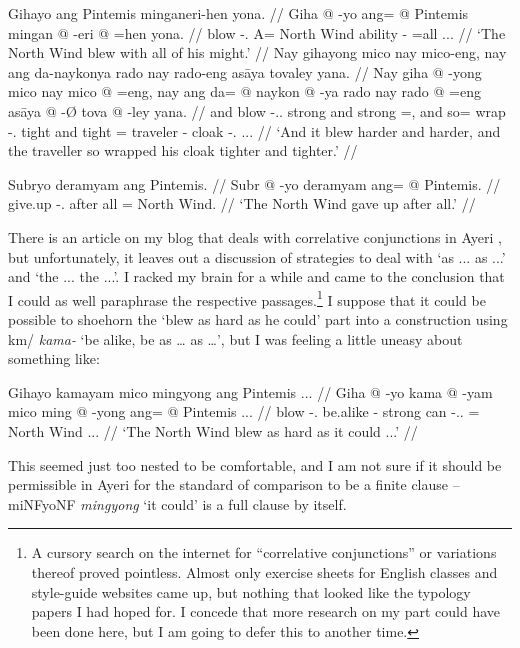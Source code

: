 \documentclass[12pt,paper=a4]{scrartcl}
\newcommand{\ques}{\fakesuperscript{?}} %
\newcommand{\xayr}[3]{{\Tagati #1} \emph{#2} \enquote*{#3}}
\begin{document}
\pex %
\a \begingl
	\glpreamble Gihayo ang Pintemis minganeri-hen yona. //
	\gla Giha @ -yo ang= @ Pintemis mingan @ -eri @ =hen yona. //
	\glb blow -\Tsg{}.\N{} A= {North Wind} ability -\Ins{} =all \Tsg{}.\N{}.\Gen{}. //
	\glft `The North Wind blew with all of his might.' //
\endgl
\a \begingl
	\glpreamble Nay gihayong mico nay mico-eng, nay ang da-naykonya rado nay rado-eng asāya tovaley yana. //
	\gla Nay giha @ -yong mico nay mico @ =eng, nay ang da= @ naykon @ -ya rado nay rado @ =eng asāya @ -Ø tova @ -ley yana. //
	\glb and blow -\Tsg.\N{}.\Aarg{} strong and strong =\Comp{}, and \AgtT{} so= wrap -\Tsg{}.\M{} tight and tight =\Comp{} traveler -\Top{} cloak -\Parg{}.\Inan{} \Tsg{}.\M{}.\Gen{}. //
	\glft `And it blew harder and harder, and the traveller so wrapped his cloak tighter and tighter.' //
\endgl

\a \begingl
	\glpreamble Subryo deramyam ang Pintemis. //
	\gla Subr @ -yo deramyam ang= @ Pintemis. //
	\glb give.up -\Tsg{}.\N{} {after all} \Aarg{}= {North Wind}. //
	\glft `The North Wind gave up after all.' //
\endgl
\xe

There is an article on my blog that deals with correlative conjunctions in Ayeri \autocite{becker2012}, but unfortunately, it leaves out a discussion of strategies to deal with `as ... as ...' and `the ... the ...'. I racked my brain for a while and came to the conclusion that I could as well paraphrase the respective passages.\footnote{A cursory search on the internet for \enquote{correlative conjunctions} or variations thereof proved pointless. Almost only exercise sheets for English classes and style-guide websites came up, but nothing that looked like the typology papers I had hoped for. I concede that more research on my part could have been done here, but I am going to defer this to another time.} I suppose that it could be possible to shoehorn the `blew as hard as he could' part into a construction using \xayr{km/}{kama-}{be alike, be as … as …}, but I was feeling a little uneasy about something like:

\ex[exno=iii]
\begingl
	\glpreamble \judge\ques{}Gihayo kamayam mico mingyong ang Pintemis ... //
	\gla Giha @ -yo kama @ -yam mico ming @ -yong ang= @ Pintemis ... //
	\glb blow -\Tsg{}.\N{} be.alike -\Ptcp{} strong can -\Tsg{}.\N{}.\Aarg{} \Aarg{}= {North Wind} ... //
	\glft `The North Wind blew as hard as it could ...' //
\endgl
\xe

This seemed just too nested to be comfortable, and I am not sure if it should be permissible in Ayeri for the standard of comparison to be a finite clause -- \xayr{miNFyoNF}{mingyong}{it could} is a full clause by itself.
\end{document}
